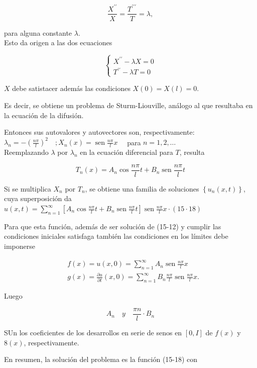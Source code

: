 \documentclass[10pt]{article}
\theoremstyle{plain}
\theoremstyle{definition}
\theoremstyle{remark}
\begin{document}
$$
\frac{X^{\prime \prime}}{X}=\frac{T^{\prime \prime \prime}}{T}=\lambda,
$$

para alguna constante $\lambda$.\\
Esto da origen a las dos ecuaciones

$$
\left\{\begin{array}{l}
X^{\prime \prime}-\lambda X=0 \\
T^{\prime \prime}-\lambda T=0
\end{array}\right.
$$

$X$ debe satistacer además las condiciones $X(0)=X(l)=0$.

Es decir, se obtiene un problema de Sturm-Liouville, análogo al que resultaba en la ecuación de la difusión.

Entonces sus autovalores y autovectores son, respectivamente:\\
$\lambda_{n}=-\left(\frac{n \pi}{l}\right)^{2} \quad ; X_{n}(x)=\operatorname{sen} \frac{n \pi}{l} x \quad$ para $n=1,2, \ldots$\\
Reemplazando $\lambda$ por $\lambda_{n}$ en la ecuación diferencial para $T$, resulta

$$
T_{n}(x)=A_{n} \cos \frac{n \pi}{l} t+B_{n} \operatorname{sen} \frac{n \pi}{l} t
$$

Si se multiplica $X_{n}$ por $T_{n}$, se obtiene una familia de soluciones $\left\{u_{n}(x, t)\right\}$, cuya superposición da\\
$u(x, t)=\sum_{n=1}^{\infty}\left[A_{n} \cos \frac{n \pi}{l} t+B_{n} \operatorname{sen} \frac{n \pi}{l} t\right] \operatorname{sen} \frac{n \pi}{l} x \cdot(15 \cdot 18)$

Para que esta función, además de ser solución de (15-12) y cumplir las condiciones iniciales satisfaga también las condiciones en los límites debe imponerse

$$
\begin{aligned}
& f(x)=u(x, 0)=\sum_{n=1}^{\infty} A_{n} \operatorname{sen} \frac{n \pi}{l} x \\
& g(x)=\frac{\partial u}{\partial t}(x, 0)=\sum_{n=1}^{\infty} B_{n} \frac{n \pi}{l} \operatorname{sen} \frac{n \pi}{l} x .
\end{aligned}
$$

Luego

$$
A_{n} \quad y \quad \frac{\pi n}{l} \cdot B_{n}
$$

SUn los coeficientes de los desarrollos en serie de senos en $[0, I]$ de $f(x)$ y $8(x)$, respectivamente.

En resumen, la solución del problema es la función (15-18) con
\end{document}
